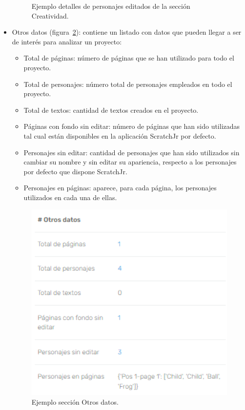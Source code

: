 \documentclass[a4paper, 12pt]{book}
\begin{document}
\begin{itemize}
\begin{figure}[H]
        \caption{Ejemplo detalles de personajes editados de la sección Creatividad.}
        \label{fig:personajes-editados-detalles}
    \end{figure}
    
    \item Otros datos (figura~\ref{fig:otros_datos}): contiene un listado con datos que pueden llegar a ser de interés para analizar un proyecto:
     \begin{itemize}
        \item Total de páginas: número de páginas que se han utilizado para todo el proyecto.
        \item Total de personajes: número total de personajes empleados en todo el proyecto.
        \item Total de textos: cantidad de textos creados en el proyecto.
        \item Páginas con fondo sin editar: número de páginas que han sido utilizadas tal cual están disponibles en la aplicación ScratchJr por defecto.
        \item Personajes sin editar: cantidad de personajes que han sido utilizados sin cambiar su nombre y sin editar su apariencia, respecto a los personajes por defecto que dispone ScratchJr.
        \item Personajes en páginas: aparece, para cada página, los personajes utilizados en cada una de ellas.
     \end{itemize}
    \begin{figure}[H]
        \centering
        \includegraphics[width=11cm, keepaspectratio]{img/otros_datos.PNG}
        \caption{Ejemplo sección Otros datos.}
        \label{fig:otros_datos}
    \end{figure}
\end{itemize}
\end{document}

